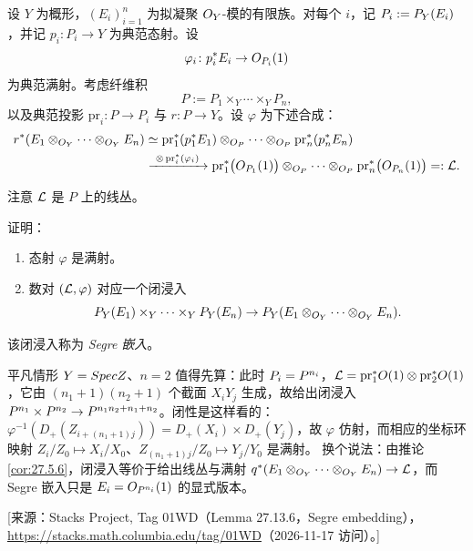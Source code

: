 \begin{construction}\label{con:27.6.1}
设 $Y$ 为概形，$(E_i)_{i=1}^n$ 为拟凝聚 $O_Y$-模的有限族。对每个 $i$，记 $P_i := P_Y(E_i)$，并记 $p_i \colon P_i \to Y$ 为典范态射。设
\[
\varphi_i \colon p_i^*E_i \to O_{P_i}(1)
\]
为典范满射。考虑纤维积
\[
P := P_1 \times_Y \cdots \times_Y P_n,
\]
以及典范投影 $\mathrm{pr}_i \colon P \to P_i$ 与 $r \colon P \to Y$。设 $\varphi$ 为下述合成：
\[
\begin{aligned}
r^*(E_1 \otimes_{O_Y} \cdots \otimes_{O_Y} E_n) &\simeq \mathrm{pr}_1^*(p_1^*E_1) \otimes_{O_P} \cdots \otimes_{O_P} \mathrm{pr}_n^*(p_n^*E_n)\\
&\xrightarrow{\ \otimes\, \mathrm{pr}_i^*(\varphi_i)\ } \mathrm{pr}_1^*\bigl(O_{P_1}(1)\bigr) \otimes_{O_P} \cdots \otimes_{O_P} \mathrm{pr}_n^*\bigl(O_{P_n}(1)\bigr) =: \mathcal{L}.
\end{aligned}
\]
\end{construction}

注意 $\mathcal{L}$ 是 $P$ 上的线丛。

\begin{exercise}\label{exc:27.6.2}
证明：
\begin{enumerate}[label=(\arabic*),leftmargin=2.4em,itemsep=0.25ex]
  \item 态射 $\varphi$ 是满射。
  \item 数对 $(\mathcal{L}, \varphi)$ 对应一个闭浸入
  \[
  P_Y(E_1) \times_Y \cdots \times_Y P_Y(E_n) \to P_Y(E_1 \otimes_{O_Y} \cdots \otimes_{O_Y} E_n).
  \]
\end{enumerate}
\end{exercise}

该闭浸入称为 \emph{Segre 嵌入}。

\begin{yizhu}
平凡情形 $Y = Spec Z$、$n = 2$ 值得先算：此时 $P_i = P^{n_i}$，$\mathcal{L} = \mathrm{pr}_1^*O(1) \otimes \mathrm{pr}_2^*O(1)$，它由 $(n_1+1)(n_2+1)$ 个截面 $X_iY_j$ 生成，故给出闭浸入 $P^{n_1} \times P^{n_2} \to P^{n_1 n_2 + n_1 + n_2}$。闭性是这样看的：$\varphi^{-1}(D_+(Z_{i + (n_1+1)j})) = D_+(X_i) \times D_+(Y_j)$，故 $\varphi$ 仿射，而相应的坐标环映射 $Z_i/Z_0 \mapsto X_i/X_0$、$Z_{(n_1+1)j}/Z_0 \mapsto Y_j/Y_0$ 是满射。
换个说法：由推论 \ref{cor:27.5.6}，闭浸入等价于给出线丛与满射 $q^*(E_1 \otimes_{O_Y} \cdots \otimes_{O_Y} E_n) \to \mathcal{L}$，而 Segre 嵌入只是 $E_i = O_{P^{n_i}}(1)$ 的显式版本。

[来源：Stacks Project, Tag 01WD（Lemma 27.13.6，Segre embedding），\url{https://stacks.math.columbia.edu/tag/01WD}（2026-11-17 访问）。]
\end{yizhu}

